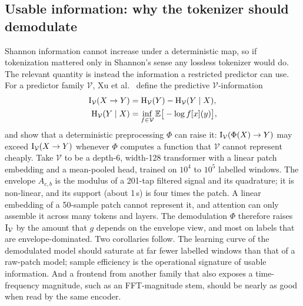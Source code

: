 \subsection{Usable information: why the tokenizer should demodulate}
\label{sec:usable}
Shannon information cannot increase under a deterministic map, so if tokenization mattered only in Shannon's sense any lossless tokenizer would do. The relevant quantity is instead the information a restricted predictor can use. For a predictor family $\mathcal{V}$, Xu et al.~\cite{xu2020usable} define the predictive $\mathcal{V}$-information
\begin{equation}
\begin{split}
\mathrm{I}_{\mathcal{V}}(X \to Y) &= \mathrm{H}_{\mathcal{V}}(Y) - \mathrm{H}_{\mathcal{V}}(Y \mid X),\\
\mathrm{H}_{\mathcal{V}}(Y \mid X) &= \inf_{f \in \mathcal{V}} \mathbb{E}\big[-\log f[x](y)\big],
\end{split}
\label{eq:vinfo}
\end{equation}
and show that a deterministic preprocessing $\Phi$ can raise it: $\mathrm{I}_{\mathcal{V}}(\Phi(X) \to Y)$ may exceed $\mathrm{I}_{\mathcal{V}}(X \to Y)$ whenever $\Phi$ computes a function that $\mathcal{V}$ cannot represent cheaply. Take $\mathcal{V}$ to be a depth-6, width-128 transformer with a linear patch embedding and a mean-pooled head, trained on $10^4$ to $10^5$ labelled windows. The envelope $A_{c,b}$ is the modulus of a 201-tap filtered signal and its quadrature; it is non-linear, and its support (about 1\,s) is four times the patch. A linear embedding of a 50-sample patch cannot represent it, and attention can only assemble it across many tokens and layers. The demodulation $\Phi$ therefore raises $\mathrm{I}_{\mathcal{V}}$ by the amount that $g$ depends on the envelope view, and most on labels that are envelope-dominated. Two corollaries follow. The learning curve of the demodulated model should saturate at far fewer labelled windows than that of a raw-patch model; sample efficiency is the operational signature of usable information. And a frontend from another family that also exposes a time-frequency magnitude, such as an FFT-magnitude stem, should be nearly as good when read by the same encoder.

